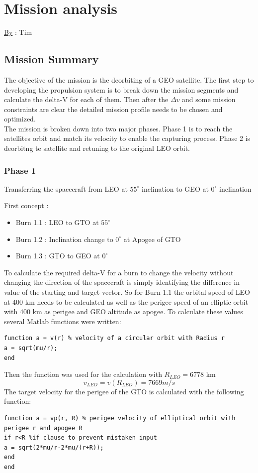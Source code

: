 \chapter{Mission analysis}
\qquad \underline{By} : Tim
\section{Mission Summary}
The objective of the mission is the deorbiting of a GEO satellite. The first step to developing the
propulsion system is to break down the mission segments and calculate the delta-V for each of them.
Then after the $\Delta v$ and some mission constraints are clear the detailed mission profile needs to be chosen and optimized.\\

The mission is broken down into two major phases. Phase 1 is to reach the satellites orbit and match its
velocity to enable the capturing process. Phase 2 is deorbitng te satellite and retuning to the original LEO orbit.
\subsection{Phase 1}
\begin{center}
	Transferring the spacecraft from LEO at $55^\circ$ inclination to GEO at $0^\circ$ inclination
\end{center}
First concept : \\

\begin{itemize}
	\item Burn 1.1 : LEO to GTO at $55^\circ$
	\item Burn 1.2 : Inclination change to $0^\circ$ at Apogee of GTO
	\item Burn 1.3 : GTO to GEO at $0^\circ$
\end{itemize}
To calculate the required delta-V for a burn to change the velocity without changing the direction of the spacecraft is simply identifying the difference in value of the starting and target vector. So for Burn 1.1 the orbital speed of LEO at 400 km needs to be calculated as well as the perigee speed of an elliptic orbit with 400 km as perigee and GEO altitude as apogee. To calculate these values several Matlab functions were written:

\begin{verbatim}
function a = v(r) % velocity of a circular orbit with Radius r
a = sqrt(mu/r);
end
\end{verbatim}
Then the function was used for the calculation with $R_{LEO} = 6778$ km
\begin{equation}
	v_{LEO} = v(R_{LEO}) = 7669 m/s
\end{equation}
The target velocity for the perigee of the GTO is calculated with the following function:
\begin{verbatim}
function a = vp(r, R) % perigee velocity of elliptical orbit with perigee r and apogee R
if r<R %if clause to prevent mistaken input
a = sqrt(2*mu/r-2*mu/(r+R));
end
end
\end{verbatim}

